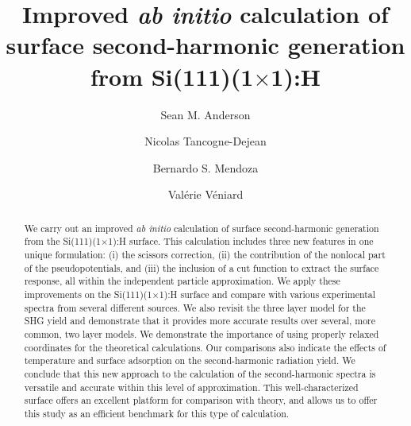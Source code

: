 \documentclass[prb,superscriptaddress,showpacs,twocolumn,letterpaper]{revtex4}
\begin{document}
\title{Improved \emph{ab initio} calculation of surface second-harmonic
generation from Si(111)(1$\times$1):H}

\author{Sean M. Anderson}
\author{Nicolas Tancogne-Dejean}
\author{Bernardo S. Mendoza}
\author{Val\'erie V\'eniard}

\begin{abstract}
We carry out an improved \emph{ab initio} calculation of surface second-harmonic
generation from the Si(111)(1$\times$1):H surface. This calculation includes
three new features in one unique formulation: (i) the scissors correction, (ii)
the contribution of the nonlocal part of the pseudopotentials, and (iii) the
inclusion of a cut function to extract the surface response, all within the
independent particle approximation. We apply these improvements on the
Si(111)(1$\times$1):H surface and compare with various experimental spectra from
several different sources. We also revisit the three layer model for the SHG
yield and demonstrate that it provides more accurate results over several, more
common, two layer models. We demonstrate the importance of using properly
relaxed coordinates for the theoretical calculations. Our comparisons also
indicate the effects of temperature and surface adsorption on the
second-harmonic radiation yield. We conclude that this new approach to the
calculation of the second-harmonic spectra is versatile and accurate within this
level of approximation. This well-characterized surface offers an excellent
platform for comparison with theory, and allows us to offer this study as an
efficient benchmark for this type of calculation.
\end{abstract}


\maketitle
\end{document}
